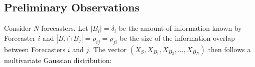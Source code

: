 \documentclass[12pt]{article}
\theoremstyle{definition}
\theoremstyle{definition}
\begin{document}
\subsection{Preliminary Observations}
\label{prelim}
Consider $N$ forecasters. Let $|B_i| = \delta_i$ be the amount of
information known by Forecaster $i$ and $|B_i
\cap B_j| = \rho_{ij} = \rho_{ji}$ be the size of the information overlap between
Forecasters $i$ and $j$. The vector
$\left(X_{S}, X_{B_1}, X_{B_2}, \dots, X_{B_N}\right)$ then follows a multivariate Gaussian distribution:
\end{document}

